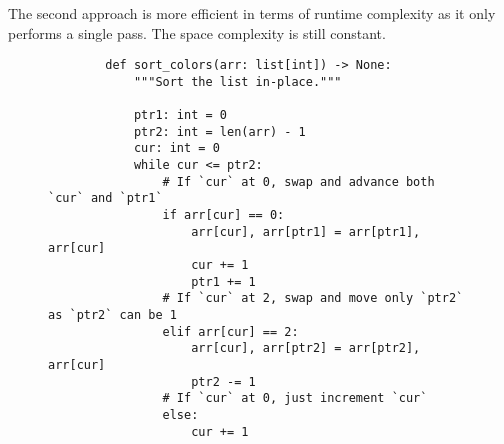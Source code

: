 \clearpage

The second approach is more efficient in terms of runtime complexity as it only
performs a single pass. The space complexity is still constant.

\begin{figure}[H]
    \centering
    \begin{verbatim}
        def sort_colors(arr: list[int]) -> None:
            """Sort the list in-place."""

            ptr1: int = 0
            ptr2: int = len(arr) - 1
            cur: int = 0
            while cur <= ptr2:
                # If `cur` at 0, swap and advance both `cur` and `ptr1`
                if arr[cur] == 0:
                    arr[cur], arr[ptr1] = arr[ptr1], arr[cur]
                    cur += 1
                    ptr1 += 1
                # If `cur` at 2, swap and move only `ptr2` as `ptr2` can be 1
                elif arr[cur] == 2:
                    arr[cur], arr[ptr2] = arr[ptr2], arr[cur]
                    ptr2 -= 1
                # If `cur` at 0, just increment `cur`
                else:
                    cur += 1
    \end{verbatim}
\end{figure}
